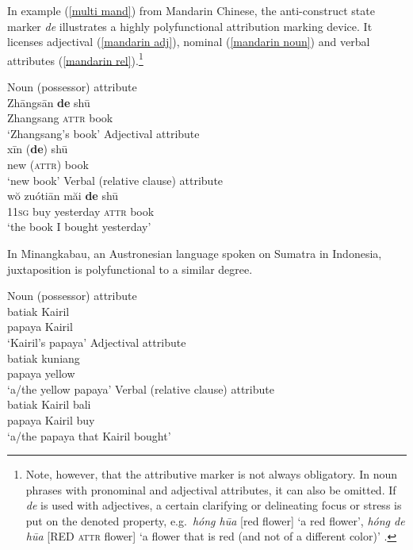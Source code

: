 In example (\ref{multi mand}) from Mandarin Chinese, the anti-construct state marker \textit{de} illustrates a highly polyfunctional attribution marking device. It licenses adjectival (\ref{mandarin adj}), nominal (\ref{mandarin noun}) and verbal attributes (\ref{mandarin rel}).\footnote{Note, however, that the attributive marker is not always obligatory. In noun phrases with pronominal and adjectival attributes, it can also be omitted. If \textit{de} is used with adjectives, a certain clarifying or delineating focus or stress is put on the denoted property, e.g.~\textit{hóng hūa} [red flower] ‘a red flower’, \textit{hóng de hūa} [RED \textsc{attr} flower] ‘a flower that is red (and not of a different color)’ \citep[119–123]{li-etal1981}.}
\begin{exe}
\ex
{} \label{multi mand}
\begin{xlist}
\ex	\rm{Noun (possessor) attribute}\\
\gll	Zhāngsān 	\textbf{de} 	shū\\
	Zhangsang 	{\textsc{attr}} 	book\\
\glt	‘Zhangsang's book’\label{mandarin noun}
\ex	\rm{Adjectival attribute}\\
\gll	xīn 		(\textbf{de}) 	shū\\
	new	 	({\textsc{attr}}) 	book\\
\glt	‘new book’\label{mandarin adj}
\ex	\rm{Verbal (relative clause) attribute}\\
\gll	wŏ zuótiān 	măi 	\textbf{de} 	shū\\
	1\textsc{1sg} 	buy	yesterday 	{\textsc{attr}} 	book\\
\glt	‘the book I bought yesterday’\label{mandarin rel}
\end{xlist}
\end{exe}
In Minangkabau, an Austronesian language spoken on Sumatra in Indonesia, juxtaposition is polyfunctional to a similar degree.
\begin{exe}
\ex 
{} \label{multi minangkabau}
\begin{xlist}
\ex \rm{Noun (possessor) attribute}\\
\gll	batiak Kairil\\
	papaya Kairil\\
\glt	‘Kairil's papaya’
\ex \rm{Adjectival attribute}\\
\gll	batiak kuniang\\
	papaya yellow\\
\glt	‘a/the yellow papaya’
\ex \rm{Verbal (relative clause) attribute}\\
\gll	batiak Kairil bali\\
	papaya Kairil buy\\
\glt	‘a/the papaya that Kairil bought’
\end{xlist}
\end{exe}
